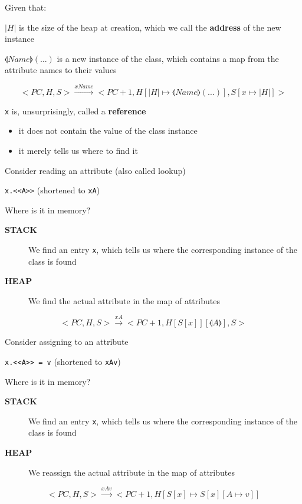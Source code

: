 \documentclass{beamer}
\begin{document}
\begin{slide}{
\item Given that:
\item $|H|$ is the size of the heap at creation, which we call the \textbf{address} of the new instance
\item $\llangle Name \rrangle(...)$ is a new instance of the class, which contains a map from the attribute names to their values

\fontsize{8pt}{7.2}\selectfont
$$<PC,H,S> \overset{xName}{\rightarrow} <PC+1,H[|H| \mapsto \llangle Name \rrangle(\dots)],S[x \mapsto |H|]>$$

\item \texttt{x} is, unsurprisingly, called a \textbf{reference}
\begin{itemize}
\item it does not contain the value of the class instance
\item it merely tells us where to find it
\end{itemize}
}\end{slide}

\begin{slide}{
\item Consider reading an attribute (also called lookup)
\item \texttt{x.<<A>>} (shortened to \texttt{xA})
\item Where is it in memory?
\begin{description}
\item[\textbf{STACK}] We find an entry \texttt{x}, which tells us where the corresponding instance of the class is found 
\item[\textbf{HEAP}] We find the actual attribute in the map of attributes
\end{description}

$$<PC,H,S> \overset{xA}{\rightarrow} <PC+1,H[S[x]][\llangle A \rrangle],S>$$
}\end{slide}

\begin{slide}{
\item Consider assigning to an attribute
\item \texttt{x.<<A>> = v} (shortened to \texttt{xAv})
\item Where is it in memory?
\begin{description}
\item[\textbf{STACK}] We find an entry \texttt{x}, which tells us where the corresponding instance of the class is found 
\item[\textbf{HEAP}] We reassign the actual attribute in the map of attributes
\end{description}

$$<PC,H,S> \overset{xAv}{\rightarrow} <PC+1,H[S[x] \mapsto S[x][A \mapsto v]]$$
}\end{slide}
\end{document}
